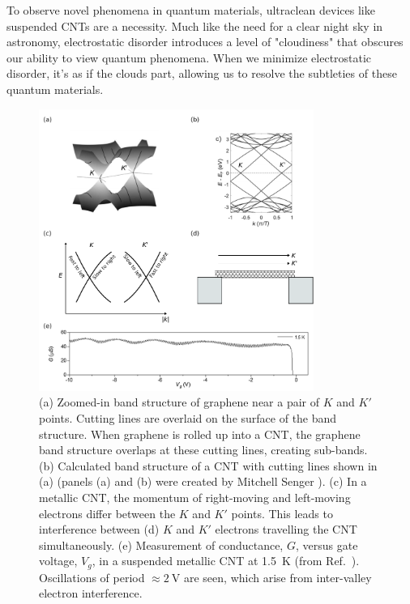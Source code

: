 \documentclass[double,12pt,1in,seploa]{beavtex}
\begin{document}
To observe novel phenomena in quantum materials, ultraclean devices like suspended CNTs are a necessity. Much like the need for a clear night sky in astronomy, electrostatic disorder introduces a level of "cloudiness" that obscures our ability to view quantum phenomena. When we minimize electrostatic disorder, it’s as if the clouds part, allowing us to resolve the subtleties of these quantum materials. 

\begin{figure}
    \includegraphics[width = 0.8\textwidth]{CNT intro fig}
    \caption{(a) Zoomed-in band structure of graphene near a pair of $K$ and $K'$ points. Cutting lines are overlaid on the surface of the band structure. When graphene is rolled up into a CNT, the graphene band structure overlaps at these cutting lines, creating sub-bands. (b) Calculated band structure of a CNT with cutting lines shown in (a) (panels (a) and (b) were created by Mitchell Senger \cite{senger_optoelectronics_2021}). (c) In a metallic CNT, the momentum of right-moving and left-moving electrons differ between the $K$ and $K'$ points. This leads to interference between (d) $K$ and $K'$ electrons travelling the CNT simultaneously. (e) Measurement of conductance, $G$, versus gate voltage, $V_g$, in a suspended metallic CNT at \SI{1.5}{\kelvin} (from Ref.\ \cite{lotfizadeh_quantum_2021}). Oscillations of period $\approx \SI{2}{\volt}$ are seen, which arise from inter-valley electron interference.}
    \label{CNT intro fig}
\end{figure}
\end{document}
